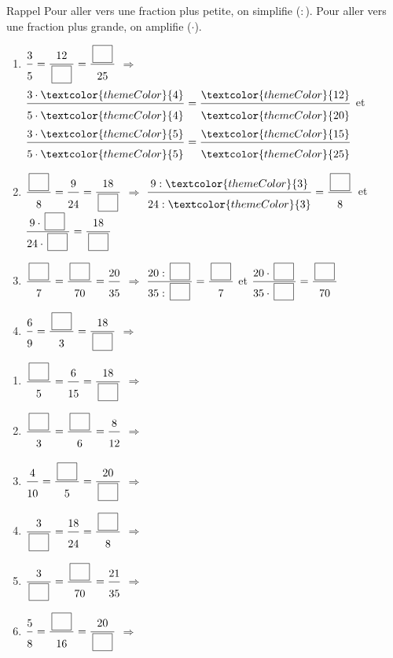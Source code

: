 \vfill


\vspace{10pt}\begin{astuce}{Rappel}
Pour aller vers une fraction plus petite, on simplifie ($:$). Pour aller vers une fraction plus grande, on amplifie ($\cdot$).
\end{astuce}\vspace{15pt}

\begin{enumerate}[leftmargin=*,align=parleft, label=\alph*), itemsep=9pt]
\item $\FA{3}{5}=\FA{12}{\CaseC}=\FA{\CaseC}{25}$ \quad $\Longrightarrow$ \quad $\FA{3 \cdot \textcolor{themeColor}{4}}{5 \cdot \textcolor{themeColor}{4}}=\FA{\textcolor{themeColor}{12}}{\textcolor{themeColor}{20}}$ \quad et \quad $\FA{3 \cdot \textcolor{themeColor}{5}}{5 \cdot \textcolor{themeColor}{5}}=\FA{\textcolor{themeColor}{15}}{\textcolor{themeColor}{25}}$
\item $\FA{\CaseC}{8}=\FA{9}{24}=\FA{18}{\CaseC}$ \quad $\Longrightarrow$ \quad $\FA{9 : \textcolor{themeColor}{3}}{24 : \textcolor{themeColor}{3}}=\FA{\CaseC}{8}$ \quad et \quad $\FA{9 \cdot \CaseC}{24 \cdot \CaseC}=\FA{18}{\CaseC}$
\item $\FA{\CaseC}{7}=\FA{\CaseC}{70}=\FA{20}{35}$ \quad $\Longrightarrow$ \quad $\FA{20 : \CaseC}{35 : \CaseC}=\FA{\CaseC}{7}$ \quad et \quad $\FA{20 \cdot \CaseC}{35 \cdot \CaseC}=\FA{\CaseC}{70}$
\item $\FA{6}{9}=\FA{\CaseC}{3}=\FA{18}{\CaseC}$ \quad $\Longrightarrow$
\end{enumerate}
\newpage
\begin{enumerate}[leftmargin=*,align=parleft, label=\alph*), itemsep=9pt, start=5]
\item $\FA{\CaseC}{5}=\FA{6}{15}=\FA{18}{\CaseC}$ \quad $\Longrightarrow$
\item $\FA{\CaseC}{3}=\FA{\CaseC}{6}=\FA{8}{12}$ \quad $\Longrightarrow$
\item $\FA{4}{10}=\FA{\CaseC}{5}=\FA{20}{\CaseC}$ \quad $\Longrightarrow$
\item $\FA{3}{\CaseC}=\FA{18}{24}=\FA{\CaseC}{8}$ \quad $\Longrightarrow$
\item $\FA{3}{\CaseC}=\FA{\CaseC}{70}=\FA{21}{35}$ \quad $\Longrightarrow$
\item $\FA{5}{8}=\FA{\CaseC}{16}=\FA{20}{\CaseC}$ \quad $\Longrightarrow$
\end{enumerate}

